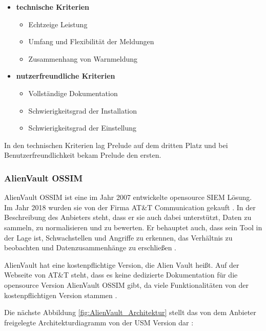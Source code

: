 \begin{itemize}[noitemsep]
   \item \textbf{technische Kriterien}
   \begin{itemize}[noitemsep]
      \item Echtzeige Leistung %
      \item Umfang und Flexibilität der Meldungen %
      \item Zusammenhang von Warnmeldung %
   \end{itemize}

   \item \textbf{nutzerfreundliche Kriterien}
   \begin{itemize}[noitemsep]
      \item Vollständige Dokumentation %
      \item Schwierigkeitsgrad der Installation %
      \item Schwierigkeitsgrad der Einstellung %
   \end{itemize}
\end{itemize}

In den technischen Kriterien lag Prelude auf dem dritten Platz und bei Benutzerfreundlichkeit bekam Prelude den ersten.

\subsubsection{AlienVault OSSIM}
AlienVault OSSIM ist eine im Jahr 2007 entwickelte \gls{opensource} \gls{SIEM} Lösung. Im Jahr 2018 wurden sie von der Firma AT\&T Communication gekauft  \citep{CBN_AV}. In der Beschreibung des Anbieters steht, dass er sie auch dabei unterstützt, Daten zu sammeln, zu normalisieren und zu bewerten. Er behauptet auch, dass sein Tool in der Lage ist, Schwachstellen und Angriffe zu erkennen, das Verhältnis zu beobachten und Datenzusammenhänge zu erschließen \citep{ATT_AVO}.

AlienVault hat eine kostenpflichtige Version, die Alien Vault  heißt. Auf der Webseite von AT\&T steht, dass es keine dedizierte Dokumentation für die \gls{opensource} Version AlienVault OSSIM gibt, da viele Funktionalitäten von der kostenpflichtigen Version stammen \citep{ATT_AVO}.

Die nächste Abbildung \ref{fig:AlienVault_Architektur} stellt das von dem Anbieter freigelegte Architekturdiagramm von der \gls{USM} Version dar \citep{ATT_AVO}:

